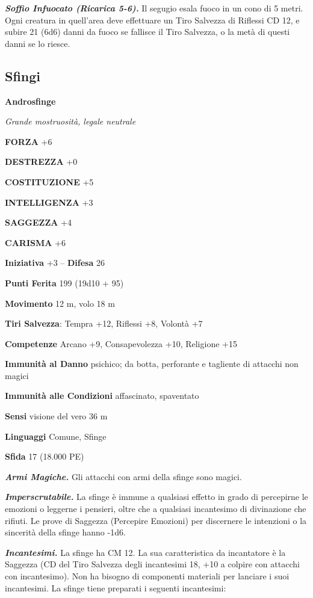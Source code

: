 \begin{multicols}{2}
\emph{\textbf{Soffio Infuocato (Ricarica 5-6).}} Il segugio esala fuoco in un cono di 5 metri. Ogni creatura in quell'area deve effettuare un Tiro Salvezza di Riflessi CD 12, e subire 21 (6d6) danni da fuoco se fallisce il Tiro Salvezza, o la metà di questi danni se lo riesce.



\subsection{Sfingi}

\medskip{}\textbf{Androsfinge}

\emph{Grande mostruosità, legale neutrale}

\textbf{FORZA} +6

\textbf{DESTREZZA} +0

\textbf{COSTITUZIONE} +5

\textbf{INTELLIGENZA} +3

\textbf{SAGGEZZA} +4

\textbf{CARISMA} +6

\textbf{Iniziativa} +3 -- \textbf{Difesa} 26

\textbf{Punti Ferita} 199 (19d10 + 95)

\textbf{Movimento} 12 m, volo 18 m

\textbf{Tiri Salvezza}: Tempra +12, Riflessi +8, Volontà +7

\textbf{Competenze} Arcano +9, Consapevolezza +10, Religione +15

\textbf{Immunità al Danno} psichico; da botta, perforante e tagliente di attacchi non magici

\textbf{Immunità alle Condizioni} affascinato, spaventato 

\textbf{Sensi} visione del vero 36 m 

\textbf{Linguaggi} Comune, Sfinge

\textbf{Sfida} 17 (18.000 PE)

\emph{\textbf{Armi Magiche.}} Gli attacchi con armi della sfinge sono magici.

\emph{\textbf{Imperscrutabile.}} La sfinge è immune a qualsiasi effetto in grado di percepirne le emozioni o leggerne i pensieri, oltre che a qualsiasi incantesimo di divinazione che rifiuti. Le prove di Saggezza (Percepire Emozioni) per discernere le intenzioni o la sincerità della sfinge hanno -1d6.

\emph{\textbf{Incantesimi.}} La sfinge ha CM 12.
La sua caratteristica da incantatore è la Saggezza (CD del Tiro Salvezza degli incantesimi 18, +10 a colpire con attacchi con incantesimo). Non ha bisogno di componenti materiali per lanciare i suoi incantesimi. La sfinge tiene preparati i seguenti incantesimi:


\end{multicols}

